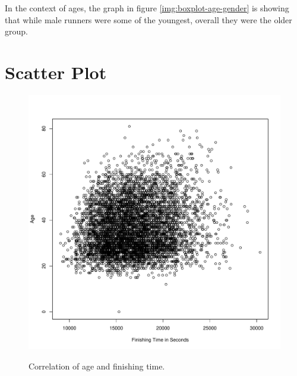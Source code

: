 \documentclass{tufte-book} %
\begin{document}
In the context of ages, the graph in figure \ref{img:boxplot-age-gender} is showing that while male runners were some of the youngest, overall they were the older group.

\section{Scatter Plot}

\begin{figure}
	\centering
	\includegraphics{graphics/plot-age-time}
	\label{img:plot-age-time}
	\caption{Correlation of age and finishing time.}
\end{figure}
\end{document}
